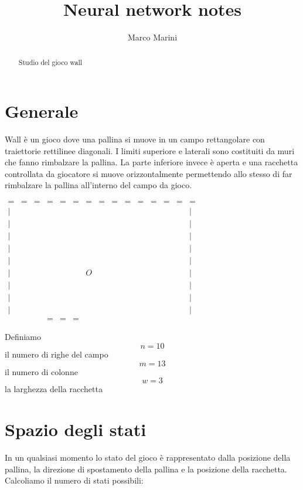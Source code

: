 \documentclass[a4paper,11pt]{article}
\title{Neural network notes}
\author{Marco Marini}
\begin{document}
\maketitle
\tableofcontents

\begin{abstract}
Studio del gioco wall
\end{abstract}

\section{Generale}

Wall è un gioco dove una pallina si muove in un campo rettangolare con traiettorie rettilinee diagonali.
I limiti superiore e laterali sono costituiti da muri che
fanno rimbalzare la pallina.
La parte inferiore invece è aperta e una racchetta controllata
da giocatore si muove orizzontalmente permettendo allo stesso di far rimbalzare la pallina all'interno del campo da 
gioco.

$
\begin{array}{ccccccccccccccc}
=	& = & = & = & = & = & = & = & = & = & = & = & = & = & = \\
|	&  &  &  &  &  &  &  &  &  &  &  &  &  & | \\ 
|	&  &  &  &  &  &  &  &  &  &  &  &  &  & | \\ 
|	&  &  &  &  &  &  &  &  &  &  &  &  &  & | \\ 
|	&  &  &  &  &  &  &  &  &  &  &  &  &  & | \\ 
|	&  &  &  &  &  &  &  &  &  &  &  &  &  & | \\ 
|	&  &  &  &  &  & O &  &  &  &  &  &  &  & | \\ 
|	&  &  &  &  &  &  &  &  &  &  &  &  &  & | \\ 
|	&  &  &  &  &  &  &  &  &  &  &  &  &  & | \\ 
|	&  &  &  &  &  &  &  &  &  &  &  &  &  & | \\ 
	&  &  & = & = & = &  &  &  &  &  &  &  &  & 
\end{array} 
$

Definiamo 
\[ n = 10 \] il numero di righe del campo
\[ m = 13 \] il numero di colonne
\[ w = 3 \] la larghezza della racchetta


\section{Spazio degli stati}

In un qualsiasi momento lo stato del gioco è rappresentato dalla posizione
della pallina, la direzione di spostamento della pallina e la posizione della racchetta.
Calcoliamo il numero di stati possibili:
\end{document}
